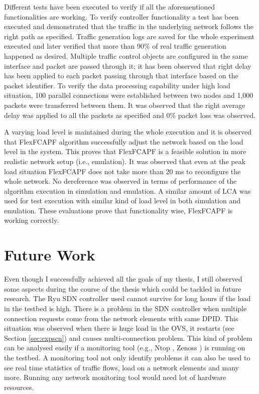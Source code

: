 Different tests have been executed to verify if all the aforementioned functionalities are working. To verify controller functionality a test has been executed and demonstrated that the traffic in the underlying network follows the right path as specified. Traffic generation logs are saved for the whole experiment executed and later verified that more than 90\% of real traffic generation happened as desired. Multiple traffic control objects are configured in the same interface and packet are passed through it; it has been observed that right delay has been applied to each packet passing through that interface based on the packet identifier. To verify the data processing capability under high load situation, 100 parallel connections were established between two nodes and 1,000 packets were transferred between them. It was observed that the right average delay was applied to all the packets as specified and 0\% packet loss was observed.

A varying load level is maintained during the whole execution and it is observed that FlexFCAPF algorithm successfully adjust the network based on the load level in the system. This proves that FlexFCAPF is a feasible solution in more realistic network setup (i.e., emulation). It was observed that even at the peak load situation FlexFCAPF does not take more than 20 ms to reconfigure the whole network. No dereference was observed in terms of performance of the algorithm execution in simulation and emulation. A similar amount of LCA was used for test execution with similar kind of load level in both simulation and emulation. These evaluations prove that functionality wise, FlexFCAPF is working correctly.

\section{Future Work}
Even though I successfully achieved all the goals of my thesis, I still observed some aspects during the course of the thesis which could be tackled in future research. The Ryu SDN controller used cannot survive for long hours if the load in the testbed is high. There is a problem in the SDN controller when multiple connection requests come from the network elements with same DPID. This situation was observed when there is huge load in the OVS, it restarts (see Section \ref{sec:expscn}) and causes multi-connection problem. This kind of problem can be analysed easily if a monitoring tool (e.g., Ntop \cite{ntop}, Zenoss \cite{zenoss}) is running on the testbed. A monitoring tool not only identify problems it can also be used to see real time statistics of traffic flows, load on a network elements and many more. Running any network monitoring tool would need lot of hardware resources. 

